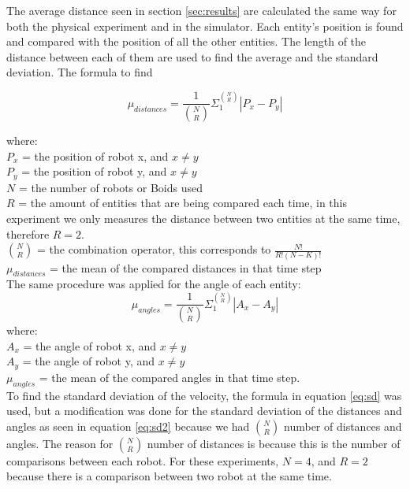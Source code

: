 The average distance seen in section \ref{sec:results} are calculated the same way for both the physical experiment and in the simulator. Each entity's position is found and compared with the position of all the other entities. The length of the distance between each of them are used to find the average and the standard deviation.
The formula to find 

\begin{equation}
\mu_{distances} = \frac{1}{ {N \choose R}} \Sigma_1^{N \choose R} | P_x - P_y |
\end{equation}

where:
\\
$P_x$ = the position of robot x, and $x \neq y$
\\
$P_y$ = the position of robot y, and $x \neq y$
\\
$N$ = the number of robots or Boids used
\\
$R$ = the amount of entities that are being compared each time, in this experiment we only measures the distance between two entities at the same time, therefore $R = 2$.
\\
$N \choose R$ = the combination operator, this corresponds to $ \frac{N!}{R! (N-K)!}$
\\
$\mu_{distances}$ = the mean of the compared distances in that time step
\\

The same procedure was applied for the angle of each entity: 
\begin{equation}
\mu_{angles} = \frac{1}{ {N \choose R}} \Sigma_1^{N \choose R} | A_x - A_y |
\end{equation}
where:
\\
$A_x$ = the angle of robot x, and $x \neq y$
\\
$A_y$ = the angle of robot y, and $x \neq y$
\\
$\mu_{angles}$ = the mean of the compared angles in that time step.
\\

To find the standard deviation of the velocity, the formula in equation \ref{eq:sd} was used, but a modification was done for the standard deviation of the distances and angles as seen in equation \ref{eq:sd2} because we had $ {N \choose R}$ number of distances and angles. The reason for $ {N \choose R}$ number of distances is because this is the number of comparisons between each robot. For these experiments, $N = 4$, and $R = 2$ because there is a comparison between two robot at the same time.


